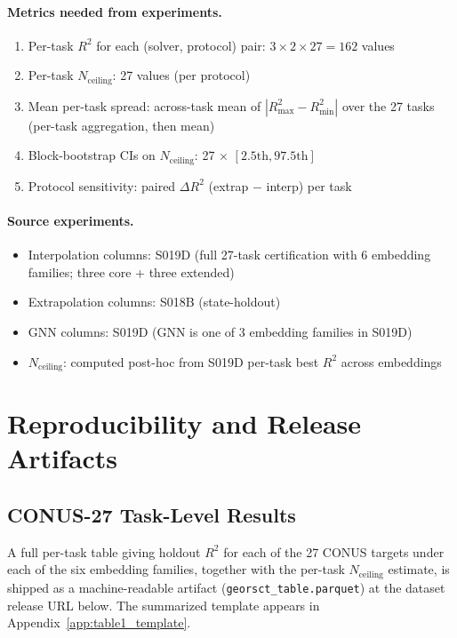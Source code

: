 \documentclass{article}
\begin{document}
\paragraph{Metrics needed from experiments.}
\begin{enumerate}
\item Per-task $R^2$ for each (solver, protocol) pair: $3 \times 2 \times 27 = 162$ values
\item Per-task $N_{\text{ceiling}}$: 27 values (per protocol)
\item Mean per-task spread: across-task mean of $|R^2_{\max} - R^2_{\min}|$ over the 27 tasks (per-task aggregation, then mean)
\item Block-bootstrap CIs on $N_{\text{ceiling}}$: 27 $\times$ $[2.5\text{th}, 97.5\text{th}]$
\item Protocol sensitivity: paired $\Delta R^2$ (extrap $-$ interp) per task
\end{enumerate}

\paragraph{Source experiments.}
\begin{itemize}
\item Interpolation columns: S019D (full 27-task certification with 6 embedding families; three core + three extended)
\item Extrapolation columns: S018B (state-holdout)
\item GNN columns: S019D (GNN is one of 3 embedding families in S019D)
\item $N_{\text{ceiling}}$: computed post-hoc from S019D per-task best $R^2$ across embeddings
\end{itemize}


\section{Reproducibility and Release Artifacts}
\label{app:reproducibility}

\subsection{CONUS-27 Task-Level Results}
\label{app:conus27}
A full per-task table giving holdout $R^2$ for each of the 27 CONUS targets under each of the six embedding families, together with the per-task $N_{\text{ceiling}}$ estimate, is shipped as a machine-readable artifact (\texttt{georsct\_table.parquet}) at the dataset release URL below. The summarized template appears in Appendix~\ref{app:table1_template}.
\end{document}

